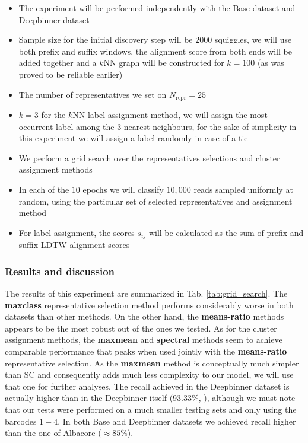 \begin{itemize}
    \item The experiment will be performed independently with the Base dataset and Deepbinner dataset
    \item Sample size for the initial discovery step will be $2000$ squiggles, we will use both prefix and suffix windows, the alignment score from both ends will be added together and a $k$NN graph will be constructed for $k=100$ (as was proved to be reliable earlier)
    \item The number of representatives we set on $N_{\text{repr}} = 25$
    \item $k = 3$ for the $k$NN label assignment method, we will assign the most occurrent label among the $3$ nearest neighbours, for the sake of simplicity in this experiment we will assign a label randomly in case of a tie
    \item We perform a grid search over the representatives selections and cluster assignment methods
    \item In each of the $10$ epochs we will classify $10,000$ reads sampled uniformly at random, using the particular set of selected representatives and assignment method
    \item For label assignment, the scores $s_{ij}$ will be calculated as the sum of prefix and suffix LDTW alignment scores 
\end{itemize}

\subsubsection{Results and discussion}
The results of this experiment are summarized in Tab. \ref{tab:grid_search}. The \textbf{maxclass} representative selection method performs considerably worse in both datasets than other methods. On the other hand, the \textbf{means-ratio} methods appears to be the most robust out of the ones we tested. As for the cluster assignment methods, the \textbf{maxmean} and \textbf{spectral} methods seem to achieve comparable performance that peaks when used jointly with the \textbf{means-ratio} representative selection. As the \textbf{maxmean} method is conceptually much simpler than SC and consequently adds much less complexity to our model, we will use that one for further analyses. The recall achieved in the Deepbinner dataset is actually higher than in the Deepbinner itself (93.33\%, \cite{Deepbinner}), although we must note that our tests were performed on a much smaller testing sets and only using the barcodes $1-4$. In both Base and Deepbinner datasets we achieved recall higher than the one of Albacore ($\approx 85\%$).


